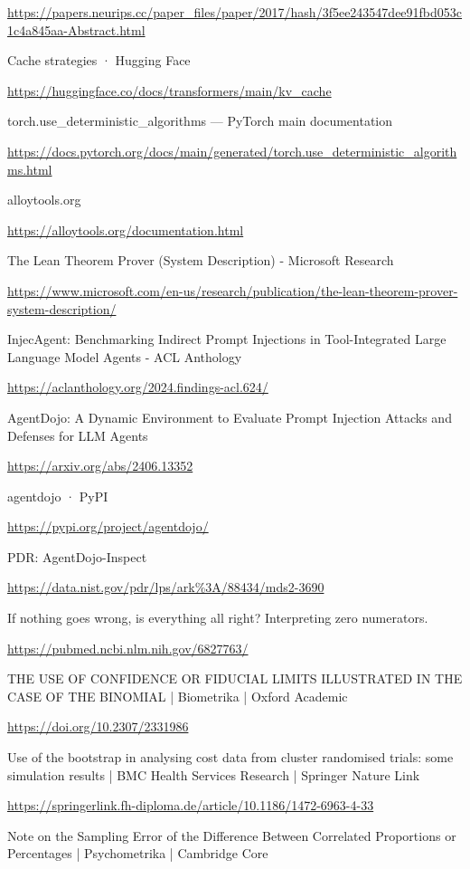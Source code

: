\documentclass[11pt,a4paper]{article}
\begin{document}
\url{https://papers.neurips.cc/paper_files/paper/2017/hash/3f5ee243547dee91fbd053c1c4a845aa-Abstract.html}\par
Cache strategies · Hugging Face\par
\url{https://huggingface.co/docs/transformers/main/kv_cache}\par
torch.use\_deterministic\_algorithms — PyTorch main documentation\par
\url{https://docs.pytorch.org/docs/main/generated/torch.use_deterministic_algorithms.html}\par
alloytools.org\par
\url{https://alloytools.org/documentation.html}\par
The Lean Theorem Prover (System Description) - Microsoft Research\par
\url{https://www.microsoft.com/en-us/research/publication/the-lean-theorem-prover-system-description/}\par
InjecAgent: Benchmarking Indirect Prompt Injections in Tool-Integrated Large Language Model Agents - ACL Anthology\par
\url{https://aclanthology.org/2024.findings-acl.624/}\par
AgentDojo: A Dynamic Environment to Evaluate Prompt Injection Attacks and Defenses for LLM Agents\par
\url{https://arxiv.org/abs/2406.13352}\par
agentdojo · PyPI\par
\url{https://pypi.org/project/agentdojo/}\par
PDR: AgentDojo-Inspect\par
\url{https://data.nist.gov/pdr/lps/ark\%3A/88434/mds2-3690}\par
If nothing goes wrong, is everything all right? Interpreting zero numerators.\par
\url{https://pubmed.ncbi.nlm.nih.gov/6827763/}\par
THE USE OF CONFIDENCE OR FIDUCIAL LIMITS ILLUSTRATED IN THE CASE OF THE BINOMIAL | Biometrika | Oxford Academic\par
\url{https://doi.org/10.2307/2331986}\par
Use of the bootstrap in analysing cost data from cluster randomised trials: some simulation results | BMC Health Services Research | Springer Nature Link\par
\url{https://springerlink.fh-diploma.de/article/10.1186/1472-6963-4-33}\par
Note on the Sampling Error of the Difference Between Correlated Proportions or Percentages | Psychometrika | Cambridge Core\par
\end{document}
